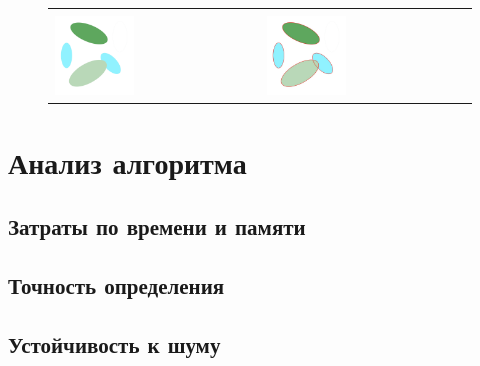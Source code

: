 \begin{figure}
\begin{tabular}{| l | l |}
  \hline 
  &\\
  \includegraphics[width=0.4\textwidth]{img/s29.jpg} & \includegraphics[width=0.4\textwidth]{img/s29r.jpg} \\
  \hline 
\end{tabular}
\end{figure}

\section{Анализ алгоритма}
\subsection{Затраты по времени и памяти}
\subsection{Точность определения}
\subsection{Устойчивость к шуму}


\Conc



\printbibliography[heading=bibintoc%
]


